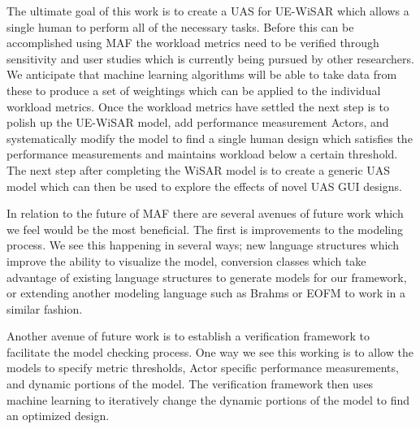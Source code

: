 The ultimate goal of this work is to create a UAS for UE-WiSAR which allows a single human to perform all of the necessary tasks.  Before this can be accomplished using MAF the workload metrics need to be verified through sensitivity and user studies which is currently being pursued by other researchers.  We anticipate that machine learning algorithms will be able to take data from these to produce a set of weightings which can be applied to the individual workload metrics.  Once the workload metrics have settled the next step is to polish up the UE-WiSAR model, add performance measurement Actors, and systematically modify the model to find a single human design which satisfies the performance measurements and maintains workload below a certain threshold.  The next step after completing the WiSAR model is to create a generic UAS model which can then be used to explore the effects of novel UAS GUI designs.

In relation to the future of MAF there are several avenues of future work which we feel would be the most beneficial.  The first is improvements to the modeling process.  We see this happening in several ways; new language structures which improve the ability to visualize the model, conversion classes which take advantage of existing language structures to generate models for our framework, or extending another modeling language such as Brahms or EOFM to work in a similar fashion.

Another avenue of future work is to establish a verification framework to facilitate the model checking process.  One way we see this working is to allow the models to specify metric thresholds, Actor specific performance measurements, and dynamic portions of the model.  The verification framework then uses machine learning to iteratively change the dynamic portions of the model to find an optimized design.



